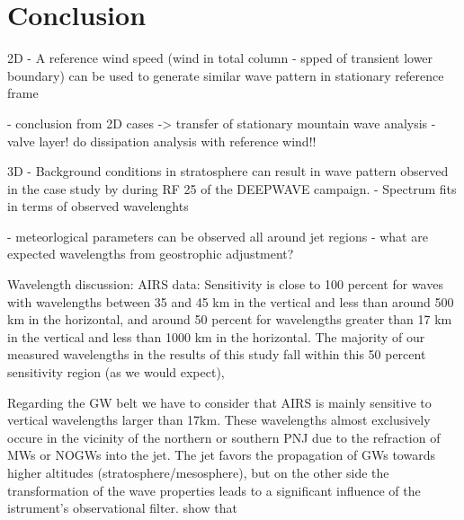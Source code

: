 \chapter{Conclusion}


2D
- A reference wind speed (wind in total column - spped of transient lower boundary) can be used to generate similar wave pattern in stationary reference frame

- conclusion from 2D cases -> transfer of stationary mountain wave analysis
- valve layer! do dissipation analysis with reference wind!!

3D
- Background conditions in stratosphere can result in wave pattern observed in the case study by \cite{dornbrack_stratospheric_2022} during RF 25 of the DEEPWAVE campaign.
- Spectrum fits in terms of observed wavelenghts

- meteorlogical parameters can be observed all around jet regions 
 - what are expected wavelengths from geostrophic adjustment?

Wavelength discussion:
AIRS data:
Sensitivity is close to 100 percent for waves with wavelengths between 35 and 45 km in the vertical and less than around 500 km in the horizontal, and around 50 percent for wavelengths greater than 17 km in the vertical and less than 1000 km in the horizontal. The majority of our measured wavelengths in the results of this study fall within this 50 percent sensitivity region (as we would expect),

Regarding the GW belt we have to consider that AIRS is mainly sensitive to vertical wavelengths larger than 17km. These wavelengths almost exclusively occure in the vicinity of the northern or southern PNJ due to the refraction of MWs or NOGWs into the jet. The jet favors the propagation of GWs towards higher altitudes (stratosphere/mesosphere), but on the other side the transformation of the wave properties leads to a significant influence of the istrument's observational filter.
\textcite[]{hindley_gravity_2019} show that 



